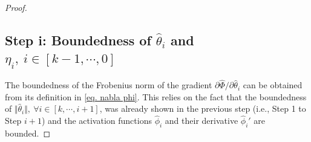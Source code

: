 \documentclass[lettersize,journal]{IEEEtran}
\begin{document}
\begin{proof}




\subsection*{Step i: Boundedness of $\hat\theta_i$ and $\eta_i, \ i\in[k-1,\cdots,0]$}


The boundedness of the Frobenius norm of the gradient $\partial\hat\Phi/\partial \hat\theta_i$ can be obtained from its definition in \eqref{eq. nabla phi}. This relies on the fact that the boundedness of $\Vert\hat\theta_i\Vert,\ \forall i\in[k,\cdots,i+1]$, was already shown in the previous step (i.e., Step 1 to Step $i+1$) and the activation functions $\hat\phi_i$ and their derivative $\hat\phi_i'$ are bounded.


\end{proof}
\end{document}

